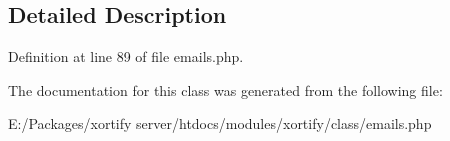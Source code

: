 \subsection{Detailed Description}


Definition at line 89 of file emails.\-php.



The documentation for this class was generated from the following file\-:\begin{DoxyCompactItemize}
\item 
E\-:/\-Packages/xortify server/htdocs/modules/xortify/class/emails.\-php\end{DoxyCompactItemize}

